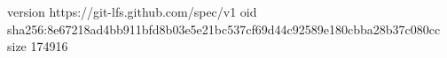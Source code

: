 version https://git-lfs.github.com/spec/v1
oid sha256:8e67218ad4bb911bfd8b03e5e21bc537cf69d44c92589e180cbba28b37c080cc
size 174916
